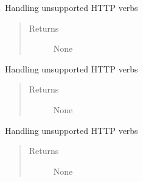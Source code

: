 \documentclass[letterpaper,10pt,english]{sphinxmanual}
\begin{document}
\begin{fulllineitems}
\begin{fulllineitems}
\end{fulllineitems}


\begin{fulllineitems}
\label{util/api:escape.util.api.AbstractRequestHandler.do_OPTIONS}
Handling unsupported HTTP verbs
\begin{quote}\begin{description}
\item[{Returns}] \leavevmode
None

\end{description}\end{quote}

\end{fulllineitems}


\begin{fulllineitems}
\label{util/api:escape.util.api.AbstractRequestHandler.do_HEAD}
Handling unsupported HTTP verbs
\begin{quote}\begin{description}
\item[{Returns}] \leavevmode
None

\end{description}\end{quote}

\end{fulllineitems}


\begin{fulllineitems}
\label{util/api:escape.util.api.AbstractRequestHandler.do_TRACE}
Handling unsupported HTTP verbs
\begin{quote}\begin{description}
\item[{Returns}] \leavevmode
None

\end{description}\end{quote}

\end{fulllineitems}



\end{fulllineitems}
\end{document}

